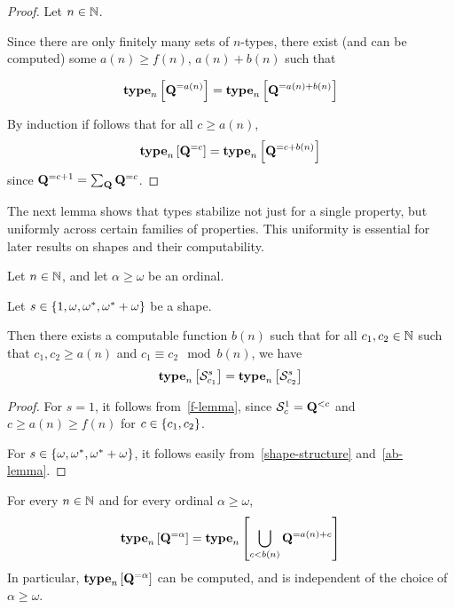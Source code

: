 \begin{proof}
    Let $n \in \mathbb{N}$.

    Since there are only finitely many sets of $n$-types,
    there exist (and can be computed)
    some $a(n) \ge f(n)$, $a(n) + b(n)$ such that

    \[
        \mathbf{type}_{n} \left[ {\mathbf{Q}^{= a(n)}} \right] = \mathbf{type}_{n} \left[ {\mathbf{Q}^{= a(n) + b(n)}} \right]
    \]

    By induction if follows that for all $c \ge a(n)$,
    \[\mathbf{type}_{n} \left[ {\mathbf{Q}^{= c}} \right] = \mathbf{type}_{n} \left[ {\mathbf{Q}^{= c + b(n)}} \right]\]
    since $\mathbf{Q}^{= c + 1} = \sum_{\mathbf{Q}} \mathbf{Q}^{= c}$.
\end{proof}

The next lemma shows that types stabilize not just for a single property, but uniformly across certain families of
properties. This uniformity is essential for later results on shapes and their computability.

\begin{corollary}\label{s-alpha-finite}
    Let $n \in \mathbb{N}$, and let $\alpha \ge \omega$ be an ordinal.

    Let $s \in \left\{ {1, \omega, \omega^\ast, \omega^\ast + \omega} \right\}$ be a shape.

    Then there exists a computable function $b(n)$ such that
    for all $c_1, c_2 \in \mathbb{N}$ such that $c_1, c_2 \ge a(n)$ and $c_1 \equiv c_2 \mod b(n)$,
    we have
    \[\mathbf{type}_{n} \left[ {\mathcal{S}^{s}_{c_1}} \right] = \mathbf{type}_{n} \left[ {\mathcal{S}^{s}_{c_2}} \right]\]
\end{corollary}

\begin{proof}
    For $s = 1$, it follows from~\cref{f-lemma},
    since $\mathcal{S}^{1}_{c} = \mathbf{Q}^{< c}$
    and $c \ge a(n) \ge f(n)$ for $c \in \left\{ {c_1, c_2} \right\}$.

    For $s \in \left\{ {\omega, \omega^\ast, \omega^\ast + \omega} \right\}$, it follows easily from~\cref{shape-structure}
    and~\cref{ab-lemma}.
\end{proof}

\begin{lemma}
    For every $n \in \mathbb{N}$ and for every ordinal $\alpha \ge \omega$,
    \[
        \mathbf{type}_{n} \left[ {\mathbf{Q}^{= \alpha}} \right] = \mathbf{type}_{n} \left[ {\bigcup_{c < b(n)}{\mathbf{Q}^{= a(n) + c}}} \right]
    \]
    In particular, $\mathbf{type}_{n} \left[ {\mathbf{Q}^{= \alpha}} \right]$ can be computed,
    and is independent of the choice of $\alpha \ge \omega$.
\end{lemma}


